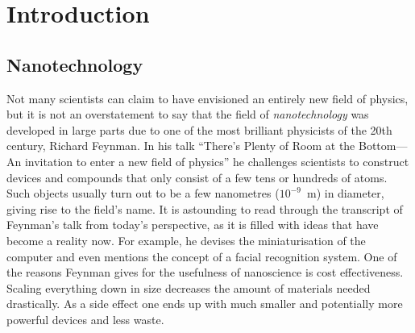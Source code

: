\acresetall
\chapter{Introduction}
\label{sec:introduction}

%
\section{Nanotechnology}
\label{sec:nanotechnology}

Not many scientists can claim to have envisioned an entirely new field of
physics, but it is not an overstatement to say that the field of
\emph{nanotechnology} was developed in large parts due to one of the most
brilliant physicists of the 20th century, Richard Feynman. In his talk ``There's
Plenty of Room at the Bottom---An invitation to enter a new field of
physics''\autocite{Feynman_TherePlentyRoom_1960} he challenges scientists to
construct devices and compounds that only consist of a few tens or hundreds of
atoms. Such objects usually turn out to be a few nanometres ($10^{-9}$~m) in
diameter, giving rise to the field's name. It is astounding to read through the
transcript of Feynman's talk from today's perspective, as it is filled with
ideas that have become a reality now. For example, he devises the
miniaturisation of the computer and even mentions the concept of a facial
recognition system. One of the reasons Feynman gives for the usefulness of nanoscience 
is cost effectiveness. Scaling everything down in size decreases the
amount of materials needed drastically. As a side effect one ends up with much
smaller and potentially more powerful devices and less waste.

